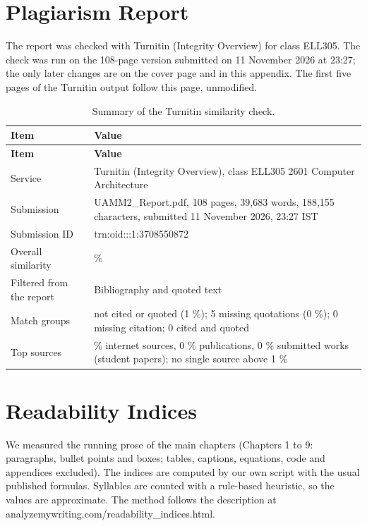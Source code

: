 \documentclass[12pt,a4paper]{report}
\begin{document}
\chapter{Plagiarism Report}\label{app:plagiarism}
The report was checked with Turnitin (Integrity Overview) for class ELL305. The check was run on the 108-page version submitted on 11 November 2026 at 23:27; the only later changes are on the cover page and in this appendix. The first five pages of the Turnitin output follow this page, unmodified.

{\fontsize{9}{10.5}\selectfont\setlength{\tabcolsep}{3pt}
\begin{longtable}{>{\raggedright\arraybackslash}p{1.56in}>{\raggedright\arraybackslash}p{4.50in}}
\caption{Summary of the Turnitin similarity check.}\\
\toprule
\textbf{Item} & \textbf{Value} \\\midrule\endfirsthead
\toprule \textbf{Item} & \textbf{Value} \\\midrule\endhead
\bottomrule\endfoot
Service & Turnitin (Integrity Overview), class ELL305 2601 Computer Architecture \\
Submission & UAMM2\_\allowbreak{}Report.pdf, 108 pages, 39,683 words, 188,155 characters, submitted 11 November 2026, 23:27 IST \\
Submission ID & trn:oid:::1:3708550872 \\
Overall similarity & 2 \% \\
Filtered from the report & Bibliography and quoted text \\
Match groups & 51 not cited or quoted (1 \%); 5 missing quotations (0 \%); 0 missing citation; 0 cited and quoted \\
Top sources & 1 \% internet sources, 0 \% publications, 0 \% submitted works (student papers); no single source above 1 \% \\
\bottomrule
\end{longtable}}

\chapter{Readability Indices}\label{app:readability}
We measured the running prose of the main chapters (Chapters 1 to 9: paragraphs, bullet points and boxes; tables, captions, equations, code and appendices excluded). The indices are computed by our own script with the usual published formulas. Syllables are counted with a rule-based heuristic, so the values are approximate. The method follows the description at analyzemywriting.com/readability\_\allowbreak{}indices.html.
\end{document}
